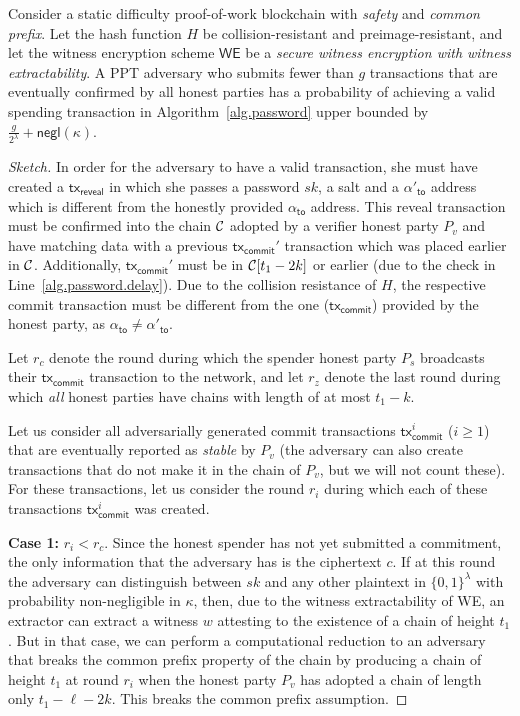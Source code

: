 \begin{lemma}\label{lem:rate-limit}
  Consider a static difficulty proof-of-work
  blockchain with \emph{safety} and \emph{common prefix}.
  Let the hash function $H$ be collision-resistant and preimage-resistant, and let
  the witness encryption scheme $\textsf{WE}$ be a \emph{secure witness encryption with witness extractability}.
  A PPT adversary who submits fewer than $g$ transactions that are
  eventually confirmed by all honest parties has a probability of
  achieving a valid spending transaction in Algorithm~\ref{alg.password}
  upper bounded by $\frac{g}{2^\lambda} + \textsf{negl}(\kappa)$.
\end{lemma}
\begin{proof}[Sketch]
  In order for the adversary to have a valid transaction, she must have created
  a $\textsf{tx}_\textsf{reveal}$ in which she passes a password $sk$, a \textsf{salt} and
  a $\alpha'_{\textsf{to}}$ address which is different from the honestly provided $\alpha_{\textsf{to}}$ address.
  This \textsf{reveal} transaction must be confirmed into the chain $\mathcal{C}$ adopted by a verifier honest
  party $P_v$ and have matching data with a previous $\textsf{tx}_\textsf{commit}'$ transaction which
  was placed earlier in $\mathcal{C}$. Additionally, $\textsf{tx}_\textsf{commit}'$ must be in $\mathcal{C}[t_1 - 2k]$
  or earlier (due to the check in Line~\ref{alg.password.delay}).
  Due to the collision resistance of $H$, the respective commit transaction must be different
  from the one ($\textsf{tx}_\textsf{commit}$) provided by the honest party, as
  $\alpha_{\textsf{to}} \neq \alpha'_{\textsf{to}}$.

  Let $r_c$ denote the round during which the spender honest party $P_s$ broadcasts
  their $\textsf{tx}_\textsf{commit}$ transaction to the network, and let $r_z$
  denote the last round during which \emph{all} honest parties have chains with length
  of at most $t_1 - k$.

  Let us consider all adversarially generated commit transactions $\textsf{tx}^i_\textsf{commit}$ ($i \geq 1$)
  that are eventually reported as \emph{stable} by $P_v$
  (the adversary can also create transactions that do not make it in the chain of $P_v$,
  but we will not count these). For these transactions, let us consider the round $r_i$ during which
  each of these transactions $\textsf{tx}^i_\textsf{commit}$ was created.

  \textbf{Case 1:} $r_i < r_c$.
  Since the honest spender has not yet submitted a commitment,
  the only information that the adversary has is the ciphertext $c$. If at this round the
  adversary can distinguish between $sk$ and any other plaintext in $\{0, 1\}^\lambda$
  with probability non-negligible in $\kappa$, then, due to the witness extractability of
  \textsf{WE}, an extractor can extract a witness $w$ attesting to the existence of a chain
  of height $t_1$. But in that case, we can perform a computational reduction to an
  adversary that breaks the common prefix property of the chain by producing a chain of
  height $t_1$ at round $r_i$ when the honest party $P_v$ has adopted a chain of length
  only $t_1 - \ell - 2k$. This breaks the common prefix assumption.


\end{proof}

